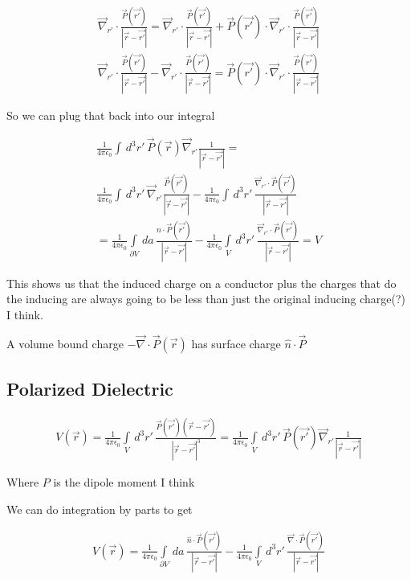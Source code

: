 \documentclass[fleqn]{report}
\newcommand{\del}{\partial}
\newcommand{\equations} [1] {
\begin{gather*}
#1
\end{gather*}
}
\begin{document}
\equations{
    \vec \nabla_{r'}
    \cdot 
    \frac{\vec P(\vec{r'})}{|\vec r - \vec{r'}|}
    =
    \vec \nabla_{r'}
    \cdot 
    \frac{\vec P(\vec{r'})}{|\vec r - \vec{r'}|}
    +
    \vec P(\vec{r'})
    \cdot 
    \vec \nabla_{r'}
    \cdot 
    \frac{\vec P(\vec{r'})}{|\vec r - \vec{r'}|}
    \\
    \vec \nabla_{r'}
    \cdot 
    \frac{\vec P(\vec{r'})}{|\vec r - \vec{r'}|}
    -
    \vec \nabla_{r'}
    \cdot 
    \frac{\vec P(\vec{r'})}{|\vec r - \vec{r'}|}
    =
    \vec P(\vec{r'})
    \cdot 
    \vec \nabla_{r'}
    \cdot 
    \frac{\vec P(\vec{r'})}{|\vec r - \vec{r'}|}
}

So we can plug that back into our integral 

\equations{
    \frac{1}{4 \pi \epsilon_0}
    \int \, d^3 r' \, 
    \vec P(\vec r)
    \vec \nabla_{r'}
    \frac{1}{|\vec r - \vec{r'}|}
    =
    \\
    \frac{1}{4 \pi \epsilon_0}
    \int \, d^3 r' \, 
    \vec \nabla_{r'}
    \frac{\vec P(\vec{r'})}{|\vec r - \vec{r'}|}
    -
    \frac{1}{4 \pi \epsilon_0}
    \int \, d^3 r' \, 
    \frac{\vec \nabla_{r'} \cdot \vec P(\vec{r'})}{|\vec r - \vec{r'}|}
    \\
    =
    \frac{1}{4 \pi \epsilon_0}
    \int\limits_{\del V} \, da \, 
    \frac{\hat n \cdot \vec P(\vec{r'})}{|\vec r - \vec{r'}|}
    -
    \frac{1}{4 \pi \epsilon_0}
    \int\limits_{V} \, d^3 r' \, 
    \frac{\vec \nabla_{r'} \cdot \vec P(\vec{r'})}{|\vec r - \vec{r'}|}
    =
    V
}

This shows us that the induced charge on a conductor plus 
the charges that do the inducing are always going to be less than just 
the original inducing charge(?) I think.  

A volume bound charge $- \vec \nabla \cdot \vec P(\vec r)$
has surface charge $\hat n \cdot \vec P$ 

\subsection{Polarized Dielectric}
\equations{
    V(\vec r)
    =
    \frac{1}{4 \pi \epsilon_0}
    \int\limits_V \, d^3 r' \,
    \frac{
        \vec P(\vec{r'}) (\vec{r} - \vec{r'})
    }
    {|\vec{r} - \vec{r'}|^3}
    =
    \frac{1}{4 \pi \epsilon_0}
    \int\limits_V \, d^3 r' \,
    \vec P(\vec{r'})
    \vec \nabla_{r'}
    \frac{1}{|\vec{r} - \vec{r'}|}
}
Where $P$ is the dipole moment I think 

We can do integration by parts to get 
\equations{
    V(\vec r)
    =
    \frac{1}{4 \pi \epsilon_0}
    \int\limits_{\del V} \, d a \,
    \frac{\hat n \cdot \vec P(\vec{r'})}{|\vec{r} - \vec{r'}|}
    -
    \frac{1}{4 \pi \epsilon_0}
    \int\limits_V \, d^3 r' \,
    \frac{\vec \nabla \cdot \vec P(\vec{r'})}{|\vec{r} - \vec{r'}|}
}
\end{document}
